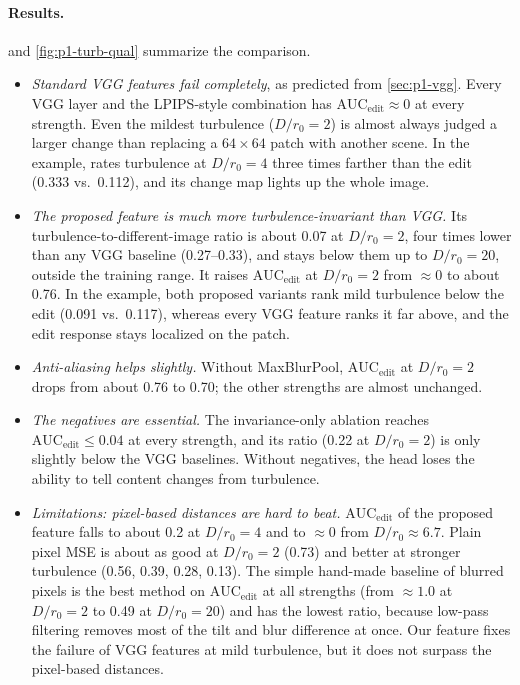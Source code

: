 \paragraph{Results.}
 and \cref{fig:p1-turb-qual} summarize the comparison.
\begin{itemize}[nosep,leftmargin=*]
  \item \emph{Standard VGG features fail completely}, as predicted from \cref{sec:p1-vgg}.
  Every VGG layer and the LPIPS-style combination has $\mathrm{AUC}_\mathrm{edit}\approx0$ at every strength.
  Even the mildest turbulence ($D/r_0=2$) is almost always judged a larger change than replacing a $64\times64$ patch with another scene.
  In the example,  rates turbulence at $D/r_0=4$ three times farther than the edit (0.333 vs.\ 0.112), and its change map lights up the whole image.
  \item \emph{The proposed feature is much more turbulence-invariant than VGG.}
  Its turbulence-to-different-image ratio is about 0.07 at $D/r_0=2$, four times lower than any VGG baseline (0.27--0.33), and stays below them up to $D/r_0=20$, outside the training range.
  It raises $\mathrm{AUC}_\mathrm{edit}$ at $D/r_0=2$ from $\approx0$ to about 0.76.
  In the example, both proposed variants rank mild turbulence below the edit (0.091 vs.\ 0.117), whereas every VGG feature ranks it far above, and the edit response stays localized on the patch.
  \item \emph{Anti-aliasing helps slightly.} Without MaxBlurPool, $\mathrm{AUC}_\mathrm{edit}$ at $D/r_0=2$ drops from about 0.76 to 0.70; the other strengths are almost unchanged.
  \item \emph{The negatives are essential.} The invariance-only ablation reaches $\mathrm{AUC}_\mathrm{edit}\le0.04$ at every strength, and its ratio (0.22 at $D/r_0=2$) is only slightly below the VGG baselines. Without negatives, the head loses the ability to tell content changes from turbulence.
  \item \emph{Limitations: pixel-based distances are hard to beat.} $\mathrm{AUC}_\mathrm{edit}$ of the proposed feature falls to about 0.2 at $D/r_0=4$ and to $\approx0$ from $D/r_0\approx6.7$. Plain pixel MSE is about as good at $D/r_0=2$ (0.73) and better at stronger turbulence (0.56, 0.39, 0.28, 0.13). The simple hand-made baseline of blurred pixels is the best method on $\mathrm{AUC}_\mathrm{edit}$ at all strengths (from $\approx1.0$ at $D/r_0=2$ to 0.49 at $D/r_0=20$) and has the lowest ratio, because low-pass filtering removes most of the tilt and blur difference at once. Our feature fixes the failure of VGG features at mild turbulence, but it does not surpass the pixel-based distances.
\end{itemize}

